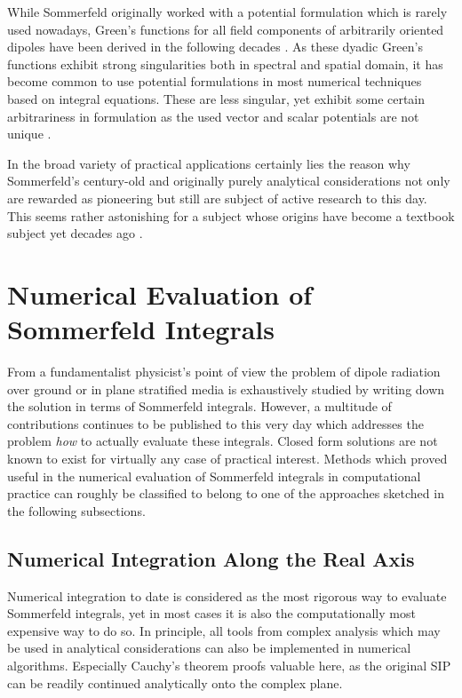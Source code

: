 While Sommerfeld originally worked with a potential formulation which is rarely
used nowadays, Green's functions for all field components of
arbitrarily oriented dipoles have been derived in the following decades 
\cite{Michalski2005}.
As these dyadic Green's functions exhibit strong singularities both in 
spectral and spatial domain, it has become common to use potential formulations
in most numerical techniques based on integral equations.
These are less singular, yet exhibit some certain arbitrariness in formulation 
as the used vector and scalar potentials are not unique
\cite{Michalski1990,Michalski1990a,Eibert1997,Michalski1997}.

In the broad variety of practical applications certainly lies the reason why
Sommerfeld's century-old and originally purely analytical considerations not
only are rewarded as pioneering but still are subject of active research to
this day.
This seems rather astonishing for a subject whose origins have become a textbook
subject yet decades ago \cite{Michalski2015, Michalski2016b, Mosig2021,koh2021}.








\section{Numerical Evaluation of Sommerfeld Integrals}

From a fundamentalist physicist's point of view the problem of dipole radiation
over ground or in plane stratified media is exhaustively studied by writing
down the solution in terms of Sommerfeld integrals.
However, a multitude of contributions continues to be published to this very
day which addresses the problem \emph{how} to actually evaluate these integrals.
Closed form solutions are not known to exist for virtually any case of practical
interest.
Methods which proved useful in the numerical evaluation of Sommerfeld integrals
in computational practice can roughly be classified to belong to one of the 
approaches sketched in the following subsections.





\subsection{Numerical Integration Along the Real Axis}
Numerical integration to date is considered as the most rigorous way to evaluate
Sommerfeld integrals, yet in most cases it is also the computationally most
expensive way to do so.
In principle, all tools from complex analysis which may be used in
analytical considerations can also be implemented in numerical algorithms.
Especially Cauchy's theorem proofs valuable here, as the original
\ac{SIP} can be readily continued analytically onto the complex plane.

